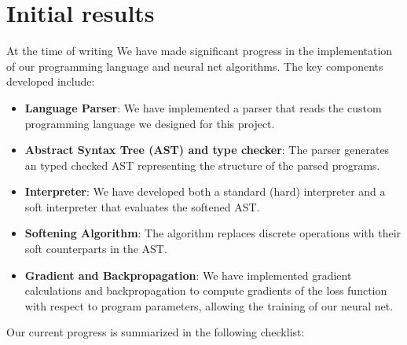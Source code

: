 \documentclass{article}
\begin{document}
\section{Initial results}

At the time of writing We have made significant progress in the implementation of our programming language and neural net algorithms. The key components developed include:

\begin{itemize}
    \item \textbf{Language Parser}: We have implemented a parser that reads the custom programming language we designed for this project.

    \item \textbf{Abstract Syntax Tree (AST) and type checker}: The parser generates an typed checked AST representing the structure of the parsed programs.

    \item \textbf{Interpreter}: We have developed both a standard (hard) interpreter and a soft interpreter that evaluates the softened AST.

    \item \textbf{Softening Algorithm}: The algorithm replaces discrete operations with their soft counterparts in the AST.

    \item \textbf{Gradient and Backpropagation}: We have implemented gradient calculations and backpropagation to compute gradients of the loss function with respect to program parameters, allowing the training of our neural net.
\end{itemize}

Our current progress is summarized in the following checklist:
\end{document}
